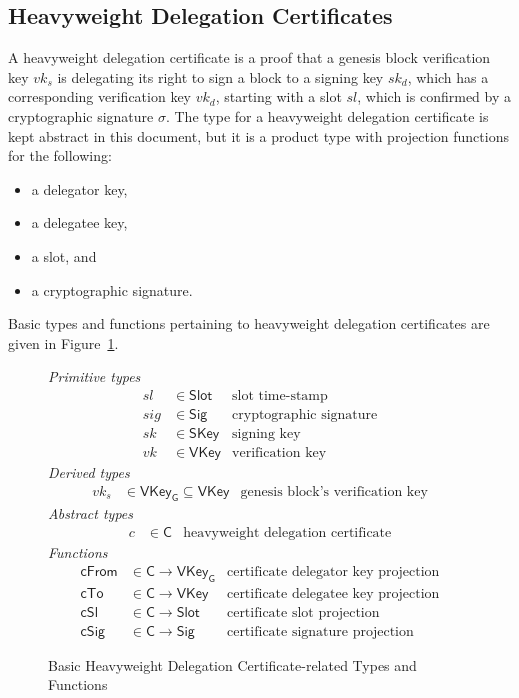 \documentclass[11pt,a4paper]{article}
\newcommand{\fun}[1]{\mathsf{#1}}
\newcommand{\type}[1]{\mathsf{#1}}
\newcommand{\Slot}{\type{Slot}}
\newcommand{\HCert}{\type{C}}
\newcommand{\SKey}{\type{SKey}}
\newcommand{\VKey}{\type{VKey}}
\newcommand{\VKeyGen}{\type{VKey_G}}
\newcommand{\Sig}{\type{Sig}}
\newcommand{\totalf}{\to}
\begin{document}
\subsection{Heavyweight Delegation Certificates}
\label{sec:certificates}

A heavyweight delegation certificate is a proof that a genesis block
verification key $vk_s$ is delegating its right to sign a block to a signing
key $sk_d$, which has a corresponding verification key $vk_d$, starting with a
slot $sl$, which is confirmed by a cryptographic signature $\sigma$.
%
The type for a heavyweight delegation certificate is kept abstract in this
document, but it is a product type with projection functions for the
following:
%
\begin{itemize}
\item a delegator key,
\item a delegatee key,
\item a slot, and
\item a cryptographic signature.
\end{itemize}

Basic types and functions pertaining to heavyweight delegation certificates
are given in Figure~\ref{fig:cert-defs}.

\begin{figure}
  \emph{Primitive types}
  \begin{align*}
    sl & \in \Slot    & \text{slot time-stamp}\\
   sig & \in \Sig     & \text{cryptographic signature}\\
    sk & \in \SKey    & \text{signing key}\\
    vk & \in \VKey    & \text{verification key}
  \end{align*}
  \emph{Derived types}
  \begin{align*}
    vk_s & \in \VKeyGen \subseteq \VKey & \text{genesis block's verification key}
  \end{align*}
  \emph{Abstract types}
  \begin{align*}
    c & \in \HCert  & \text{heavyweight delegation certificate}
  \end{align*}
  \emph{Functions}
  \begin{align*}
    \fun{cFrom} & \in \HCert \totalf \VKeyGen & \text{certificate delegator key projection} \\
    \fun{cTo} & \in \HCert \totalf \VKey & \text{certificate delegatee key projection} \\
    \fun{cSl} & \in \HCert \totalf \Slot & \text{certificate slot projection} \\
    \fun{cSig} & \in \HCert \totalf \Sig & \text{certificate signature projection}
  \end{align*}
  \caption{Basic Heavyweight Delegation Certificate-related Types and Functions}
  \label{fig:cert-defs}
\end{figure}
\end{document}
